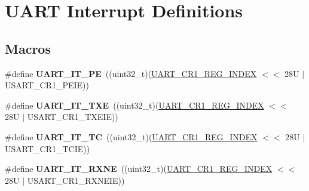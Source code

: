 \hypertarget{group___u_a_r_t___interrupt__definition}{}\section{U\+A\+RT Interrupt Definitions}
\label{group___u_a_r_t___interrupt__definition}
\subsection*{Macros}
\begin{DoxyCompactItemize}
\item 
\mbox{\label{group___u_a_r_t___interrupt__definition_ga55f922ddcf513509710ade5d7c40a1db}} 
\#define {\bfseries U\+A\+R\+T\+\_\+\+I\+T\+\_\+\+PE}~((uint32\+\_\+t)(\mbox{\hyperlink{group___u_a_r_t___private___constants_ga5917bcb19b2dab202b8cbfa82520b93e}{U\+A\+R\+T\+\_\+\+C\+R1\+\_\+\+R\+E\+G\+\_\+\+I\+N\+D\+EX}} $<$$<$ 28\+U $\vert$ U\+S\+A\+R\+T\+\_\+\+C\+R1\+\_\+\+P\+E\+I\+E))
\item 
\mbox{\label{group___u_a_r_t___interrupt__definition_ga552636e2af516d578856f5ee2ba71ed7}} 
\#define {\bfseries U\+A\+R\+T\+\_\+\+I\+T\+\_\+\+T\+XE}~((uint32\+\_\+t)(\mbox{\hyperlink{group___u_a_r_t___private___constants_ga5917bcb19b2dab202b8cbfa82520b93e}{U\+A\+R\+T\+\_\+\+C\+R1\+\_\+\+R\+E\+G\+\_\+\+I\+N\+D\+EX}} $<$$<$ 28\+U $\vert$ U\+S\+A\+R\+T\+\_\+\+C\+R1\+\_\+\+T\+X\+E\+I\+E))
\item 
\mbox{\label{group___u_a_r_t___interrupt__definition_gab9a4dc4e8cea354fd60f4117513b2004}} 
\#define {\bfseries U\+A\+R\+T\+\_\+\+I\+T\+\_\+\+TC}~((uint32\+\_\+t)(\mbox{\hyperlink{group___u_a_r_t___private___constants_ga5917bcb19b2dab202b8cbfa82520b93e}{U\+A\+R\+T\+\_\+\+C\+R1\+\_\+\+R\+E\+G\+\_\+\+I\+N\+D\+EX}} $<$$<$ 28\+U $\vert$ U\+S\+A\+R\+T\+\_\+\+C\+R1\+\_\+\+T\+C\+I\+E))
\item 
\mbox{\label{group___u_a_r_t___interrupt__definition_gac1bedf7a65eb8c3f3c4b52bdb24b139d}} 
\#define {\bfseries U\+A\+R\+T\+\_\+\+I\+T\+\_\+\+R\+X\+NE}~((uint32\+\_\+t)(\mbox{\hyperlink{group___u_a_r_t___private___constants_ga5917bcb19b2dab202b8cbfa82520b93e}{U\+A\+R\+T\+\_\+\+C\+R1\+\_\+\+R\+E\+G\+\_\+\+I\+N\+D\+EX}} $<$$<$ 28\+U $\vert$ U\+S\+A\+R\+T\+\_\+\+C\+R1\+\_\+\+R\+X\+N\+E\+I\+E))

\end{DoxyCompactItemize}

